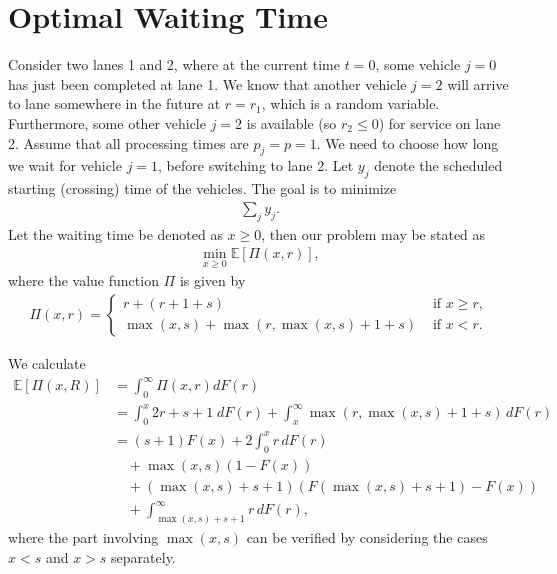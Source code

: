 \documentclass{article}
\author{Jeroen van Riel}
\date{\monthyeardate\today}
\theoremstyle{definition}
\theoremstyle{plain}
\begin{document}
\section*{Optimal Waiting Time}

Consider two lanes 1 and 2, where at the current time $t=0$, some vehicle $j=0$
has just been completed at lane 1. We know that another vehicle $j=2$ will
arrive to lane somewhere in the future at $r = r_{1}$, which is a random variable.
Furthermore, some other vehicle $j=2$ is available (so $r_{2} \leq 0$) for
service on lane 2. Assume that all processing times are $p_{j}=p=1$. We need to
choose how long we wait for vehicle $j=1$, before switching to lane 2. Let
$y_{j}$ denote the scheduled starting (crossing) time of the vehicles. The goal
is to minimize
\begin{align}
  \sum_{j} y_{j} .
\end{align}
Let the waiting time be denoted as $x \geq 0$, then our problem may be stated as
\begin{align}
  \min_{x \geq 0} \mathbb{E} \left[ \Pi(x, r) \right] ,
\end{align}
where the value function $\Pi$ is given by
\begin{align}
  \Pi(x, r) = \begin{cases}
                    r + (r + 1 + s) & \text{ if } x \geq r, \\
                    \max(x, s) + \max(r, \max(x,s) + 1 + s) & \text{ if } x < r .
                  \end{cases}
\end{align}

We calculate
\begin{align*}
  \mathbb{E}[\Pi(x, R)] &= \int_{0}^{\infty} \Pi(x,r) dF(r) \\
                        &= \int_{0}^{x} 2r + s + 1 \; dF(r) + \int_{x}^{\infty} \max(r, \max(x,s) + 1 + s) \, dF(r) \\
                        &= (s+1) F(x) + 2 \int_{0}^{x} r \, dF(r) \\
                        & \quad + \max(x,s)(1 - F(x)) \\
                        & \quad + (\max(x,s) + s + 1) \left(F(\max(x,s) + s + 1) - F(x) \right) \\
                        & \quad + \int_{\max(x,s) + s + 1}^{\infty} r \, dF(r) ,
\end{align*}
where the part involving $\max(x, s)$ can be verified by considering the cases
$x < s$ and $x > s$ separately.
\end{document}
